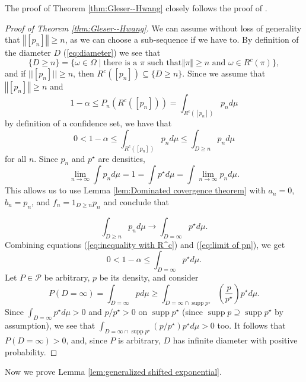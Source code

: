 \documentclass[article]{ajs}
\numberwithin{equation}{section}
\numberwithin{figure}{section}
\theoremstyle{plain}
\theoremstyle{definition}
\theoremstyle{definition}
\theoremstyle{plain}
\DeclareMathOperator{\supp}{supp}
\begin{document}
The proof of Theorem \ref{thm:Gleser--Hwang} closely follows the
proof of \citet[Theorem 1]{gleser1987nonexistence}.
\begin{proof}[Proof of Theorem \ref{thm:Gleser--Hwang}]
\label{proof:Gleser--Hwang}We can assume without loss of generality
that $\left\Vert [p_{n}]\right\Vert \geq n$, as we can choose a sub-sequence
if we have to. By definition of the diameter $D$ (\ref{eq:diameter})
we see that
\[
\{D\geq n\}=\{\omega\in\Omega\mid\textrm{there is a }\pi\textrm{ such that}\left\Vert \pi\right\Vert \geq n\textrm{ and }\omega\in R^{c}(\pi)\},
\]
and if $||[p_{n}]||\geq n$, then $R^{c}([p_{n}])\subseteq\{D\geq n\}$.
Since we assume that $\left\Vert [p_{n}]\right\Vert \geq n$ and 
\[
1-\alpha\leq P_{n}(R^{c}([p_{n}]))=\int_{R^{c}([p_{n}])}p_{n}d\mu
\]
by definition of a confidence set, we have that
\begin{equation}
0<1-\alpha\leq\int_{R^{c}([p_{n}])}p_{n}d\mu\leq\int_{D\geq n}p_{n}d\mu\label{eq:inequality with R^c}
\end{equation}
for all $n$. Since $p_{n}$ and $p^{\star}$ are densities,
\[
\lim_{n\to\infty}\int p_{n}d\mu=1=\int p^{\star}d\mu=\int\lim_{n\to\infty}p_{n}d\mu.
\]
This allows us to use Lemma \ref{lem:Dominated covergence theorem}
with $a_{n}=0$, $b_{n}=p_{n}$, and $f_{n}=1_{D\geq n}p_{n}$ and
conclude that

\begin{equation}
\int_{D\geq n}p_{n}d\mu\to\int_{D=\infty}p^{\star}d\mu.\label{eq:limit of pn}
\end{equation}
Combining equations (\ref{eq:inequality with R^c}) and (\ref{eq:limit of pn}),
we get
\[
0<1-\alpha\leq\int_{D=\infty}p^{\star}d\mu.
\]
Let $P\in\mathcal{P}$ be arbitrary, $p$ be its density, and consider
\[
P(D=\infty)=\int_{D=\infty}pd\mu\geq\int_{D=\infty\cap\supp p^{\star}}\left(\frac{p}{p^{\star}}\right)p^{\star}d\mu.
\]
Since $\int_{D=\infty}p^{\star}d\mu>0$ and $p/p^{\star}>0$ on $\supp p^{\star}$
(since $\supp p\supseteq\supp p^{\star}$ by assumption), we see that
$\int_{D=\infty\cap\supp p^{\star}}(p/p^{\star})p^{\star}d\mu>0$
too. It follows that $P(D=\infty)>0$, and, since $P$ is arbitrary,
$D$ has infinite diameter with positive probability.
\end{proof}
Now we prove Lemma \ref{lem:generalized shifted exponential}.
\end{document}
